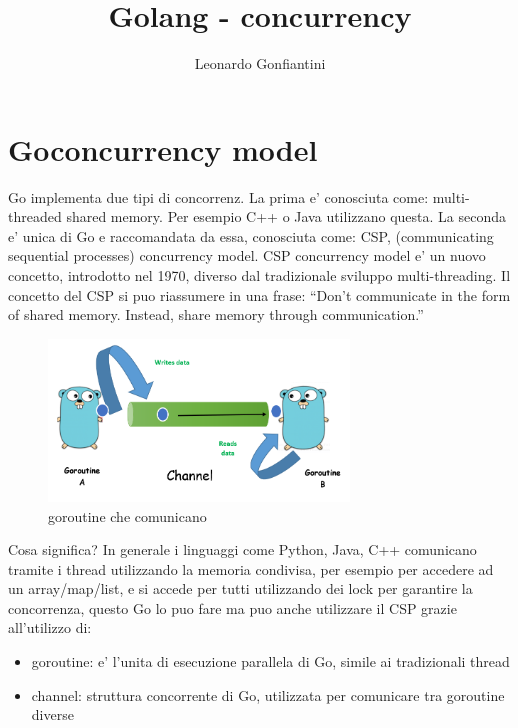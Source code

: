 \documentclass{article}
\title{Golang - concurrency}
\author{Leonardo Gonfiantini}
\date{}
\begin{document}
\maketitle

\section{Goconcurrency model}
Go implementa due tipi di concorrenz. La prima e' conosciuta come: multi-threaded shared memory. Per esempio C++ o Java utilizzano questa.
La seconda  e' unica di Go e raccomandata da essa, conosciuta come: CSP, (communicating sequential processes) concurrency model. \newline
CSP concurrency model e' un nuovo concetto, introdotto nel 1970, diverso dal tradizionale sviluppo multi-threading. \newline
Il concetto del CSP si puo riassumere in una frase: \newline
“Don’t communicate in the form of shared memory. Instead, share memory through communication.” \newline

\begin{figure}[h!]
    \centering
    \includegraphics[width=8cm]{sections/gorutine-channel.png}
    \caption{goroutine che comunicano}
    \label{fig:title}
\end{figure}

Cosa significa? In generale i linguaggi come Python, Java, C++ comunicano tramite i thread utilizzando la memoria condivisa, per esempio per accedere ad un array/map/list, e si accede per tutti utilizzando dei lock per garantire la concorrenza, questo Go lo puo fare ma puo anche utilizzare il CSP grazie all'utilizzo di:
\begin{itemize}
    \item goroutine: e' l'unita di esecuzione parallela di Go, simile ai tradizionali thread
    \item channel: struttura concorrente di Go, utilizzata per comunicare tra goroutine diverse
\end{itemize}








\end{document}
